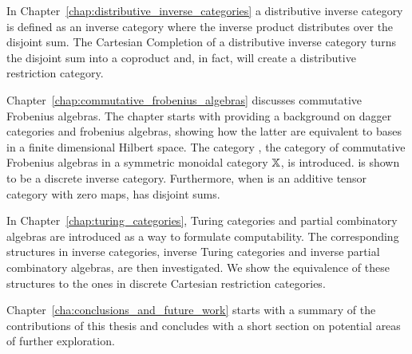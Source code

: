 In Chapter~\ref{chap:distributive_inverse_categories}  a distributive inverse category is defined as
an inverse category where the inverse product distributes over the disjoint sum. The Cartesian
Completion of a distributive inverse category turns the disjoint sum into a coproduct and, in fact,
will create a distributive restriction category.

Chapter~\ref{chap:commutative_frobenius_algebras} discusses commutative Frobenius algebras. The
chapter starts with providing a background on dagger categories and frobenius algebras, showing how
the latter are equivalent to bases in a finite dimensional Hilbert space. The category \CFrob,
the category of commutative Frobenius algebras in a symmetric monoidal category $\mathbb{X}$, is
introduced. \CFrob is shown to be a discrete inverse category. Furthermore, when \X is an
additive tensor category with zero maps, \CFrob has disjoint sums.

In Chapter~\ref{chap:turing_categories}, Turing categories and partial combinatory algebras are
introduced as a way to formulate computability. The corresponding structures in inverse categories,
inverse Turing categories and inverse partial combinatory algebras, are then investigated. We show the
equivalence of these structures to the ones in discrete Cartesian restriction categories.

Chapter~\ref{cha:conclusions_and_future_work} starts with a summary of the contributions of this
thesis and concludes with a short section on potential areas of further exploration.



